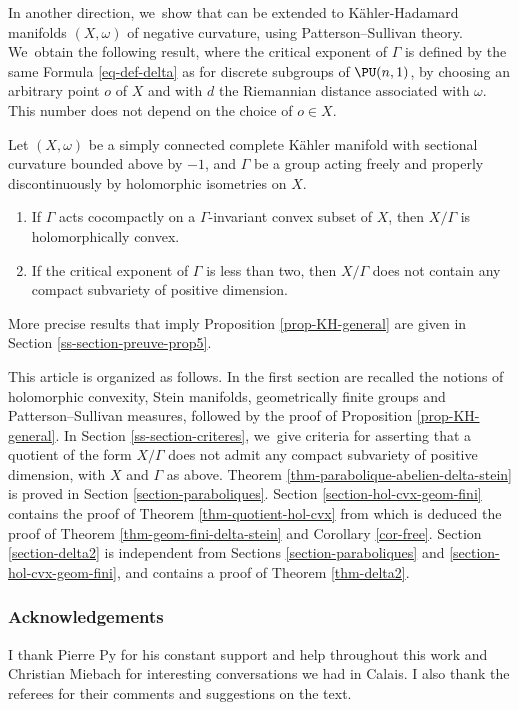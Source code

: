 In another direction, we~show that \cite[Th.\,1]{deyNoteComplexhyperbolicKleinian2020} can be extended to Kähler-Hadamard manifolds $(X,\omega)$ of negative curvature, using Patterson--Sullivan theory. We~obtain the following result, where the critical exponent of $\Gamma$ is defined by the same Formula \eqref{eq-def-delta} as for discrete subgroups of $\PU(n,1)$, by choosing an arbitrary point $o$ of $X$ and with $d$ the Riemannian distance associated with $\omega$. This number does not depend on the choice of $o\in X$.

\begin{propositionIntro}\label{prop-KH-general}
Let $(X,\omega)$ be a simply connected complete Kähler manifold with sectional curvature bounded above by $-1$, and $\Gamma$ be a group acting freely and properly discontinuously by holomorphic isometries on $X$.
\begin{enumerate}
\item If $\Gamma$ acts cocompactly on a $\Gamma$\nobreakdash-invariant convex subset of $X$, then $X/\Gamma$ is holomorphically convex.
\item If the critical exponent of $\Gamma$ is less than two, then $X/\Gamma$ does not contain any compact subvariety of positive dimension.
\end{enumerate}
\end{propositionIntro}

\noindent More precise results that imply Proposition \ref{prop-KH-general} are given in Section \ref{ss-section-preuve-prop5}.

This article is organized as follows. In the first section are recalled the notions of holomorphic convexity, Stein manifolds, geometrically finite groups and Patterson--Sullivan measures, followed by the proof of Proposition \ref{prop-KH-general}. In Section \ref{ss-section-criteres}, we~give criteria for asserting that a quotient of the form $X/\Gamma$ does not admit any compact subvariety of positive dimension, with $X$ and $\Gamma$ as above. Theorem \ref{thm-parabolique-abelien-delta-stein} is proved in Section \ref{section-paraboliques}. Section \ref{section-hol-cvx-geom-fini} contains the proof of Theorem \ref{thm-quotient-hol-cvx} from which is deduced the proof of Theorem \ref{thm-geom-fini-delta-stein} and Corollary \ref{cor-free}. Section \ref{section-delta2} is independent from Sections \ref{section-paraboliques} and \ref{section-hol-cvx-geom-fini}, and contains a proof of Theorem \ref{thm-delta2}.

\subsubsection*{Acknowledgements}
I thank Pierre Py for his constant support and help throughout this work and Christian Miebach for interesting conversations we had in Calais. I also thank the referees for their comments and suggestions on the text.

